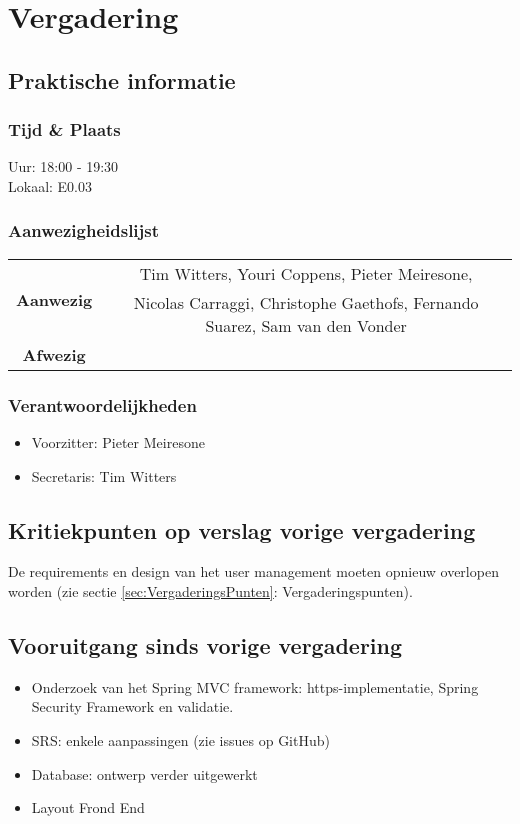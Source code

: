 \section{Vergadering \MeetingDate}
\subsection{Praktische informatie}
\subsubsection{Tijd \& Plaats}
Uur: 18:00 - 19:30
\\
Lokaal: E0.03
\subsubsection{Aanwezigheidslijst}
\begin{table}[htbp]
	\centering
	\begin{tabular}{c|c}
		\multirow{2}{*}{\textbf{Aanwezig}} & Tim Witters, Youri Coppens, Pieter Meiresone, \\
		& Nicolas Carraggi,  Christophe Gaethofs, Fernando Suarez, Sam van den Vonder \\
		\hline
		\textbf{Afwezig} & \\
	\end{tabular}
\end{table}

\subsubsection{Verantwoordelijkheden}
\begin{itemize}
	\item Voorzitter: Pieter Meiresone
	\item Secretaris: Tim Witters
\end{itemize}

\subsection{Kritiekpunten op verslag vorige vergadering}
De requirements en design van het user management moeten opnieuw overlopen worden (zie sectie \ref{sec:VergaderingsPunten}: Vergaderingspunten).

\subsection{Vooruitgang sinds vorige vergadering}
\begin{itemize}
	\item Onderzoek van het Spring MVC framework: https-implementatie, Spring Security Framework en validatie.
	\item SRS: enkele aanpassingen (zie issues op GitHub)
	\item Database: ontwerp verder uitgewerkt
	\item Layout Frond End
\end{itemize}


